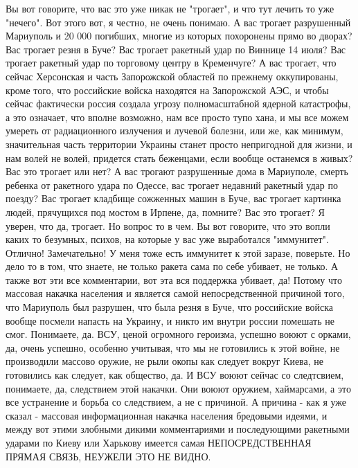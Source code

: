 Вы вот говорите, что вас это уже никак не "трогает", и что тут лечить то уже "нечего". 
Вот этого вот, я честно, не очень понимаю.
А вас трогает разрушенный Мариуполь и 20 000 погибших, многие из которых похоронены прямо во дворах? 
Вас трогает резня в Буче? Вас трогает ракетный удар по Виннице
14 июля? Вас трогает ракетный удар по торговому центру в Кременчуге? А вас трогает, что сейчас Херсонская и часть Запорожской
областей по прежнему оккупированы, кроме того, что российские войска находятся на Запорожской АЭС, и чтобы
сейчас фактически россия создала угрозу полномасштабной ядерной катастрофы, а это означает, что вполне возможно, нам все просто тупо хана, и мы все можем умереть от радиационного излучения и лучевой болезни, или же, как минимум, значительная часть территории Украины станет просто непригодной для жизни, и нам волей не волей, придется стать беженцами, если вообще останемся в живых?
Вас это трогает или нет? А вас трогают разрушенные дома в Мариуполе, смерть ребенка от ракетного удара по Одессе,
вас трогает недавний ракетный удар по поезду? Вас трогает кладбище сожженных машин в Буче, вас трогает картинка людей, прячущихся
под мостом в Ирпене, да, помните? Вас это трогает? Я уверен, что да, трогает. Но вопрос то в чем. Вы вот говорите,
что это вопли каких то безумных, психов, на которые у вас уже выработался  "иммунитет". Отлично! Замечательно! У меня
тоже есть иммунитет к этой заразе, поверьте. Но дело то в том, что знаете, не только ракета сама по себе убивает, не только.
А также вот эти все комментарии, вот эта вся поддержка убивает, да! Потому что массовая накачка населения и является самой 
непосредственной причиной того, что Мариуполь был разрушен, что была резня в Буче, что российские войска вообще посмели
напасть на Украину, и никто им внутри россии помешать не смог. Понимаете, да. ВСУ, ценой огромного героизма,
успешно воюют с орками, да, очень успешно, особенно учитывая, что мы не готовились к этой войне, не производили
массово оружие, не рыли окопы как следует вокруг Киева, не готовились как следует, как общество, да. И ВСУ воюют сейчас со следтсвием, понимаете, да, следствием этой накачки. Они воюют оружием, хаймарсами, а это все устранение и борьба со следствием, а не с причиной. А причина - как я уже сказал - массовая информационная накачка населения бредовыми идеями, и между вот этими злобными дикими комментариями и последующими ракетными ударами по Киеву или Харькову имеется самая НЕПОСРЕДСТВЕННАЯ ПРЯМАЯ СВЯЗЬ, НЕУЖЕЛИ ЭТО НЕ ВИДНО.
